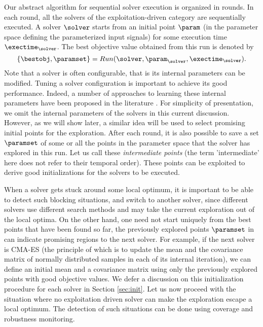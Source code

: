 Our abstract algorithm for sequential solver execution is organized in rounds. In each round, all the solvers of the exploitation-driven category are sequentially executed.  A solver $\solver$ starts from an initial point $\param$ (in the parameter space defining the parameterized input signals) for some execution time $\exectime_{\solver}$. The best objective value obtained from this run is denoted by 
$$\{ \bestobj, \paramset \} = Run(\solver, \param_{\solver}, \exectime_{\solver}).$$ 
Note that a solver is often configurable, that is its internal parameters can be modified. Tuning a solver configuration is important to achieve its good performance. Indeed, a number of approaches to learning these internal parameters have been proposed in the literature \cite{}. For simplicity of presentation, we omit the internal parameters of the solvers in this current discussion. However, as we will show later, a similar idea will be used to select promising initial points for the exploration. After each round, it is also possible to save a set $ \paramset$ of some or all the points in the parameter space that the solver has explored in this run. Let us call these {\em intermediate points} (the term 'intermediate' here does not refer to their temporal order). These points can be exploited to derive good initializations for the solvers to be executed. 

When a solver gets stuck around some local optimum, it is important to be able to detect such blocking situations, and switch to another solver, since different solvers use different search methods and may take the current exploration out of the local optima. On the other hand, one need not start uniquely from the best points that have been found so far, the previously explored points $\paramset$ in can indicate promising regions to the next solver. For example, if the next solver is CMA-ES (the principle of which is to update the mean and the covariance matrix of normally distributed samples in each of its internal iteration), we can define an initial mean and a covariance matrix using only the previously explored points with good objective values. We defer a discussion on this initialization procedure for each solver in Section \ref{sec:init}. Let us now proceed with the situation where no exploitation driven solver can make the exploration escape a local optimum. The detection of such situations can be done using coverage and robustness monitoring. 

